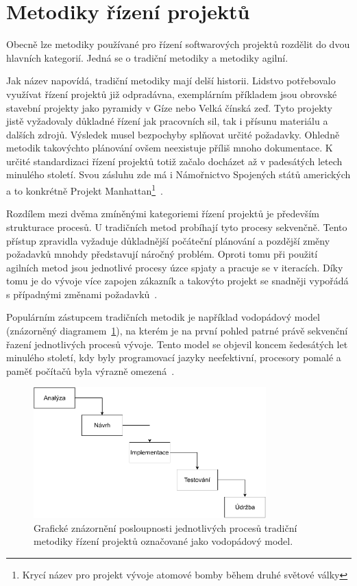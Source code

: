 \section{Metodiky řízení projektů}
Obecně lze metodiky používané pro řízení softwarových projektů rozdělit do dvou hlavních kategorií. Jedná se o tradiční metodiky a metodiky agilní.

Jak název napovídá, tradiční metodiky mají delší historii. Lidstvo potřebovalo využívat řízení projektů již odpradávna, exemplárním příkladem jsou obrovské stavební projekty jako pyramidy v Gíze nebo Velká čínská zeď. Tyto projekty jistě vyžadovaly důkladné řízení jak pracovních sil, tak i přísunu materiálu a dalších zdrojů. Výsledek musel bezpochyby splňovat určité požadavky. Ohledně metodik takovýchto plánování ovšem neexistuje příliš mnoho dokumentace. K určité standardizaci řízení projektů totiž začalo docházet až v padesátých letech minulého století. Svou zásluhu zde má i Námořnictvo Spojených států amerických a to konkrétně Projekt Manhattan\footnote{Krycí název pro projekt vývoje atomové bomby během druhé světové války}~\cite{bib:project-managment-history}.

Rozdílem mezi dvěma zmíněnými kategoriemi řízení projektů je především strukturace procesů. U tradičních metod probíhají tyto procesy sekvenčně. Tento přístup zpravidla vyžaduje důkladnější počáteční plánování a pozdější změny požadavků mnohdy představují náročný problém. Oproti tomu při použití agilních metod jsou jednotlivé procesy úzce spjaty a pracuje se v iteracích. Díky tomu je do vývoje více zapojen zákazník a takovýto projekt se snadněji vypořádá s případnými změnami požadavků~\cite{bib:agile-vs-traditional}. 

Populárním zástupcem tradičních metodik je například vodopádový model (znázorněný diagramem~\ref{img:waterfall}), na kterém je na první pohled patrné právě sekvenční řazení jednotlivých procesů vývoje. Tento model se objevil koncem šedesátých let minulého století, kdy byly programovací jazyky neefektivní, procesory pomalé a paměť počítačů byla výrazně omezená~\cite{bib:agile-history}. 

\begin{figure}[H]
	\centering
	\includegraphics[width=0.8\textwidth]{obrazky-figures/waterfall-wide.pdf}
	\caption{Grafické znázornění posloupnosti jednotlivých procesů tradiční metodiky řízení projektů označované jako vodopádový model.}
	\label{img:waterfall}
\end{figure}

